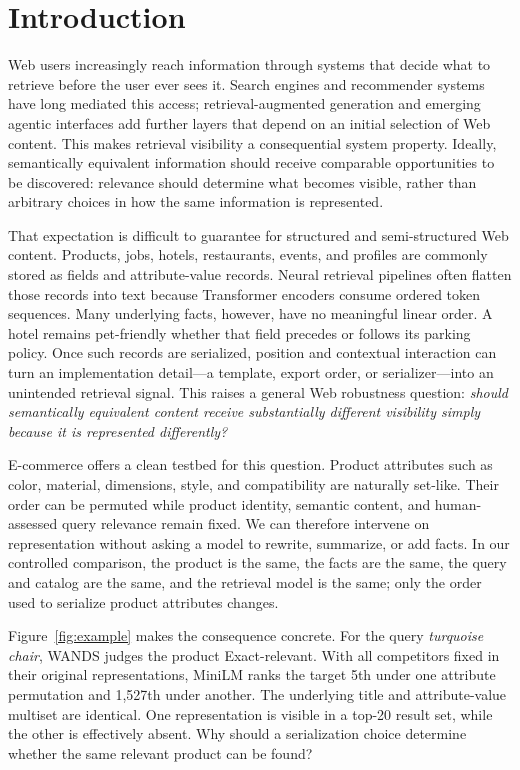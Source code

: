 \section{Introduction}

Web users increasingly reach information through systems that decide what to retrieve before the user ever sees it. Search engines and recommender systems have long mediated this access; retrieval-augmented generation and emerging agentic interfaces add further layers that depend on an initial selection of Web content. This makes retrieval visibility a consequential system property. Ideally, semantically equivalent information should receive comparable opportunities to be discovered: relevance should determine what becomes visible, rather than arbitrary choices in how the same information is represented.

That expectation is difficult to guarantee for structured and semi-structured Web content. Products, jobs, hotels, restaurants, events, and profiles are commonly stored as fields and attribute-value records. Neural retrieval pipelines often flatten those records into text because Transformer encoders consume ordered token sequences. Many underlying facts, however, have no meaningful linear order. A hotel remains pet-friendly whether that field precedes or follows its parking policy. Once such records are serialized, position and contextual interaction can turn an implementation detail---a template, export order, or serializer---into an unintended retrieval signal. This raises a general Web robustness question: \emph{should semantically equivalent content receive substantially different visibility simply because it is represented differently?}

E-commerce offers a clean testbed for this question. Product attributes such as color, material, dimensions, style, and compatibility are naturally set-like. Their order can be permuted while product identity, semantic content, and human-assessed query relevance remain fixed. We can therefore intervene on representation without asking a model to rewrite, summarize, or add facts. In our controlled comparison, the product is the same, the facts are the same, the query and catalog are the same, and the retrieval model is the same; only the order used to serialize product attributes changes.

Figure~\ref{fig:example} makes the consequence concrete. For the query \emph{turquoise chair}, WANDS judges the product Exact-relevant. With all competitors fixed in their original representations, MiniLM ranks the target 5th under one attribute permutation and 1,527th under another. The underlying title and attribute-value multiset are identical. One representation is visible in a top-20 result set, while the other is effectively absent. Why should a serialization choice determine whether the same relevant product can be found?

